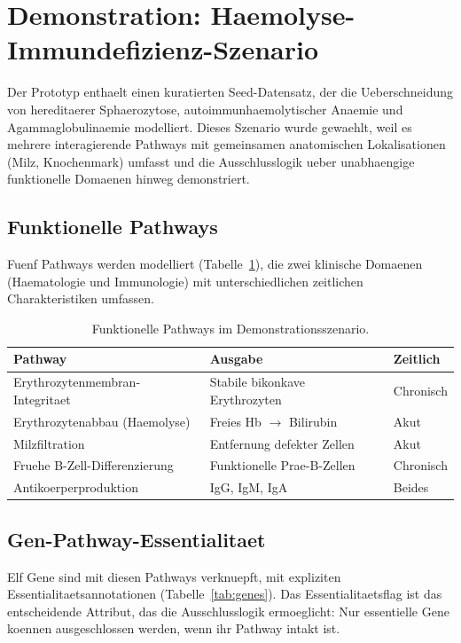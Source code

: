 \documentclass[12pt,a4paper]{article}
\begin{document}
\section{Demonstration: Haemolyse-Immundefizienz-Szenario}
\label{sec:demo}

Der Prototyp enthaelt einen kuratierten Seed-Datensatz, der die Ueberschneidung von hereditaerer Sphaerozy\-tose, autoimmunhaemolytischer Anaemie und Agammaglobulinaemie modelliert. Dieses Szenario wurde gewaehlt, weil es mehrere interagierende Pathways mit gemeinsamen anatomischen Lokalisationen (Milz, Knochenmark) umfasst und die Ausschlusslogik ueber unabhaengige funktionelle Domaenen hinweg demonstriert.

\subsection{Funktionelle Pathways}

Fuenf Pathways werden modelliert (Tabelle~\ref{tab:pathways}), die zwei klinische Domaenen (Haematologie und Immunologie) mit unterschiedlichen zeitlichen Charakteristiken umfassen.

\begin{table}[H]
\centering
\caption{Funktionelle Pathways im Demonstrationsszenario.}
\label{tab:pathways}
\begin{tabular}{lll}
\toprule
\textbf{Pathway} & \textbf{Ausgabe} & \textbf{Zeitlich} \\
\midrule
Erythrozytenmembran-Integritaet & Stabile bikonkave Erythrozyten & Chronisch \\
Erythrozytenabbau (Haemolyse) & Freies Hb $\to$ Bilirubin & Akut \\
Milzfiltration & Entfernung defekter Zellen & Akut \\
Fruehe B-Zell-Differenzierung & Funktionelle Prae-B-Zellen & Chronisch \\
Antikoerperproduktion & IgG, IgM, IgA & Beides \\
\bottomrule
\end{tabular}
\end{table}

\subsection{Gen-Pathway-Essentialitaet}

Elf Gene sind mit diesen Pathways verknuepft, mit expliziten Essentialitaetsannotationen (Tabelle~\ref{tab:genes}). Das Essentialitaetsflag ist das entscheidende Attribut, das die Ausschlusslogik ermoeglicht: Nur essentielle Gene koennen ausgeschlossen werden, wenn ihr Pathway intakt ist.
\end{document}
